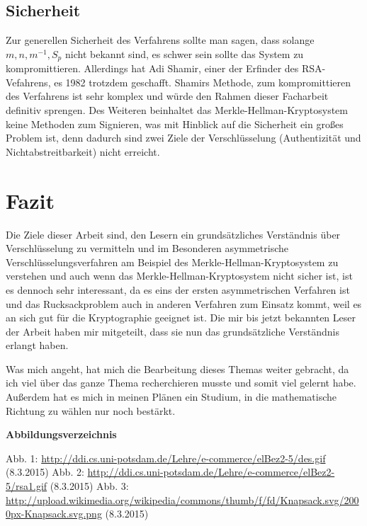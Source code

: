 \documentclass[a4paper,12pt,titlepage]{article}
\begin{document}
\subsection{Sicherheit}
Zur generellen Sicherheit des Verfahrens sollte man sagen, dass solange $m, n, m^{-1}, S_p$ nicht bekannt sind, es schwer sein sollte das System zu kompromittieren. Allerdings hat Adi Shamir, einer der Erfinder des RSA-Vefahrens, es 1982 trotzdem geschafft. Shamirs Methode, zum kompromittieren des Verfahrens ist sehr komplex und würde den Rahmen dieser Facharbeit definitiv sprengen. Des Weiteren beinhaltet das Merkle-Hellman-Kryptosystem keine Methoden zum Signieren, was mit Hinblick auf die Sicherheit ein großes Problem ist, denn dadurch sind zwei Ziele der Verschlüsselung (Authentizität und Nichtabstreitbarkeit) nicht erreicht. %

\newpage
\section{Fazit}
Die Ziele dieser Arbeit sind, den Lesern ein grundsätzliches Verständnis über Verschlüsselung zu vermitteln und im Besonderen asymmetrische Verschlüsselungsverfahren am Beispiel des Merkle-Hellman-Kryptosystem zu verstehen und
auch wenn das Merkle-Hellman-Kryptosystem nicht sicher ist, ist es dennoch sehr interessant, da es eins der ersten asymmetrischen Verfahren ist und das Rucksackproblem auch in anderen Verfahren zum Einsatz kommt, weil es an sich gut für die Kryptographie geeignet ist. Die mir bis jetzt bekannten Leser der Arbeit haben mir mitgeteilt, dass sie nun das grundsätzliche Verständnis erlangt haben.

Was mich angeht, hat mich die Bearbeitung dieses Themas weiter gebracht, da ich viel über das ganze Thema recherchieren musste und somit viel gelernt habe. Außerdem hat es mich in meinen Plänen ein Studium, in die mathematische Richtung zu wählen nur noch bestärkt.
\newpage

\begin{flushleft}

\end{flushleft}
\large
\textbf{Abbildungsverzeichnis} \newline
\normalsize
\begin{flushleft}
Abb. 1: \url{http://ddi.cs.uni-potsdam.de/Lehre/e-commerce/elBez2-5/des.gif} (8.3.2015) \newline
Abb. 2: \url{http://ddi.cs.uni-potsdam.de/Lehre/e-commerce/elBez2-5/rsa1.gif} (8.3.2015) \newline
Abb. 3: \url{http://upload.wikimedia.org/wikipedia/commons/thumb/f/fd/Knapsack.svg/2000px-Knapsack.svg.png} (8.3.2015)
\end{flushleft}
\newpage
\end{document}
